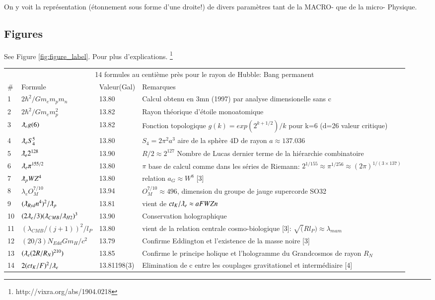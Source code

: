 \documentclass[a4paper,9pt]{article}
\begin{document}
On y voit la représentation (étonnement sous forme d'une droite!) de divers paramètres tant de la MACRO- que de la micro- Physique.


\subsection{Figures}

See Figure \ref{fig:figure_label}. Pour plus d'explications. \footnote{http://vixra.org/abs/1904.0218}
 

\begin{table*}
  \hskip-2.0cm\begin{tabular}{llll}
    \toprule
    \multicolumn{4}{c}{14 formules au centi\`{e}me pr\`{e}s pour le rayon de Hubble: Bang permanent}                   \\
    \cmidrule(r){1-4}
   \#     & Formule     & Valeur(Gal) & Remarques \\
    \midrule
    1 & $2\hbar^2/Gm_em_pm_n$ & 13.80 & Calcul obtenu en 3mn (1997) par analyse dimensionelle sans c \\
    2 & $2\hbar^2/Gm_em_p^2$ & 13.82 & Rayon th\'{e}orique d'\'{e}toile monoatomique \\
    3 & $\lambdabar_e g(6)$ & 13.82 & Fonction topologique $g(k)=exp(2^{k+1/2})/k$ pour k=6 (d=26 valeur critique)\\
    4 & $\lambdabar_e S_4^5$ & 13.80 & $S_4=2\pi^2a^3$ aire de la sph\`{e}re 4D de rayon $a \approx 137.036$ \\  
    5 & $\lambdabar_e 2^{128}$ & 13.90 & $R/2 \approx 2^{127}$ Nombre de Lucas dernier terme de la hi\'{e}rarchie combinatoire \\ 
    6 & $\lambdabar_e \pi^{155/2}$ & 13.80 & $\pi$ base de calcul comme dans les s\'{e}ries de Riemann: $2^{1/155} \approx \pi^{1/256} \approx (2\pi)^{1/(3\times 137)}$ \\
    7 & $\lambdabar_p WZ^{4}$ & 13.80 & relation $a_G \approx W^8$ [3] \\
    8 & $\lambda_e O_M^{7/10}$ & 13.94 & $O_M^{7/10} \approx 496$, dimension du groupe de jauge supercorde SO32 \\
    9 & $(\lambdabar_{Ryd} n^{4})^2/\lambdabar_p$ & 13.81 & vient de $ct_K/\lambdabar_e \approx aFWZn$ \\ 
    10 & $(2\lambdabar_{e}/3)(\lambdabar_{CMB}/\lambdabar_{H2})^3$ & 13.90 & Conservation holographique \\
    11 & $(\lambda_{CMB}/(j+1))^2/l_P$ & 13.80 & vient de la relation centrale cosmo-biologique [3]: $\sqrt(Rl_P) \approx \lambda_{mam}$ \\
    12 & $(20/3)N_{Edd}Gm_H/c^2$ & 13.79 & Confirme Eddington et l'existence de la masse noire [3] \\
    13 & $(\lambdabar_{e} (2R/R_N)^{210})$ & 13.85 & Confirme le principe holique et l'hologramme du Grandcosmos de rayon $R_N$  \\
    14 & $2(ct_K/F)^2/\lambdabar_{e}$ & 13.81198(3) & Elimination de c entre les couplages gravitationel et interm\'{e}diaire [4] \\
    \bottomrule
  \end{tabular}
  \label{tab:table}
\end{table*}
\end{document}
